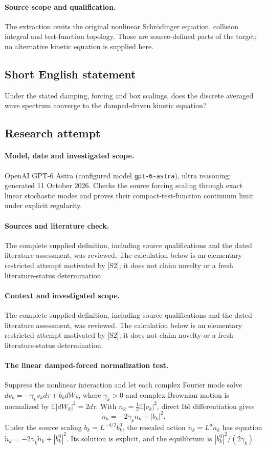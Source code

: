 \documentclass[11pt]{article}
\begin{document}
\paragraph{Source scope and qualification.}
The extraction omits the original nonlinear Schrödinger equation, collision integral and test-function topology. Those are source-defined parts of the target; no alternative kinetic equation is supplied here.
\subsection{Short English statement}
Under the stated damping, forcing and box scalings, does the discrete averaged wave spectrum converge to the damped-driven kinetic equation?
\subsection{Research attempt}
\paragraph{Model, date and investigated scope.}
OpenAI GPT-6 Astra (configured model \texttt{gpt-6-astra}), ultra reasoning; generated 11 October 2026. Checks the source forcing scaling through exact linear stochastic modes and proves their compact-test-function continuum limit under explicit regularity.

\paragraph{Sources and literature check.}
The complete supplied definition, including source qualifications and the dated literature assessment, was reviewed. The calculation below is an elementary restricted attempt motivated by [S2]; it does not claim novelty or a fresh literature-status determination.

\paragraph{Context and investigated scope.} The complete supplied definition, including source qualifications and the dated literature assessment, was reviewed. The calculation below is an elementary restricted attempt motivated by [S2]; it does not claim novelty or a fresh literature-status determination.

\paragraph{The linear damped-forced normalization test.} Suppress the nonlinear interaction and let each complex Fourier mode solve $dv_k=-\gamma_kv_kd\tau+b_kdW_k$, where $\gamma_k>0$ and complex Brownian motion is normalized by $\mathbb E|dW_k|^2=2d\tau$. With $n_k=\frac12\mathbb E|v_k|^2$, direct Itô differentiation gives
\[
 \dot n_k=-2\gamma_kn_k+|b_k|^2.
\]
Under the source scaling $b_k=L^{-d/2}b_k^0$, the rescaled action $\widetilde n_k=L^dn_k$ has equation $\dot{\widetilde n}_k=-2\gamma_k\widetilde n_k+|b_k^0|^2$. Its solution is explicit, and the equilibrium is $|b_k^0|^2/(2\gamma_k)$.
\end{document}
